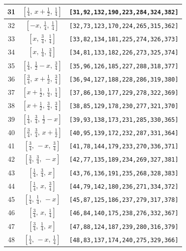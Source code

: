 \documentclass[fleqn,8pt]{jsarticle}
\begin{document}
\begin{longtable}{ccc}
31 & $\left[ \frac{1}{4},\, x + \frac{1}{2},\, \frac{1}{4} \right]$ & {\tt [31,92,132,190,223,284,324,382]} \\ \hline
32 & $\left[ - x,\, \frac{1}{4},\, \frac{1}{4} \right]$ & {\tt [32,73,123,170,224,265,315,362]} \\ \hline
33 & $\left[ x,\, \frac{3}{4},\, \frac{1}{4} \right]$ & {\tt [33,82,134,181,225,274,326,373]} \\ \hline
34 & $\left[ x,\, \frac{1}{4},\, \frac{3}{4} \right]$ & {\tt [34,81,133,182,226,273,325,374]} \\ \hline
35 & $\left[ \frac{1}{4},\, \frac{1}{2} - x,\, \frac{3}{4} \right]$ & {\tt [35,96,126,185,227,288,318,377]} \\ \hline
36 & $\left[ \frac{3}{4},\, x + \frac{1}{2},\, \frac{3}{4} \right]$ & {\tt [36,94,127,188,228,286,319,380]} \\ \hline
37 & $\left[ x + \frac{1}{2},\, \frac{1}{4},\, \frac{1}{4} \right]$ & {\tt [37,86,130,177,229,278,322,369]} \\ \hline
38 & $\left[ x + \frac{1}{2},\, \frac{3}{4},\, \frac{3}{4} \right]$ & {\tt [38,85,129,178,230,277,321,370]} \\ \hline
39 & $\left[ \frac{1}{4},\, \frac{3}{4},\, \frac{1}{2} - x \right]$ & {\tt [39,93,138,173,231,285,330,365]} \\ \hline
40 & $\left[ \frac{3}{4},\, \frac{3}{4},\, x + \frac{1}{2} \right]$ & {\tt [40,95,139,172,232,287,331,364]} \\ \hline
41 & $\left[ \frac{3}{4},\, - x,\, \frac{3}{4} \right]$ & {\tt [41,78,144,179,233,270,336,371]} \\ \hline
42 & $\left[ \frac{3}{4},\, \frac{3}{4},\, - x \right]$ & {\tt [42,77,135,189,234,269,327,381]} \\ \hline
43 & $\left[ \frac{1}{4},\, \frac{3}{4},\, x \right]$ & {\tt [43,76,136,191,235,268,328,383]} \\ \hline
44 & $\left[ \frac{1}{4},\, x,\, \frac{3}{4} \right]$ & {\tt [44,79,142,180,236,271,334,372]} \\ \hline
45 & $\left[ \frac{1}{4},\, \frac{1}{4},\, - x \right]$ & {\tt [45,87,125,186,237,279,317,378]} \\ \hline
46 & $\left[ \frac{3}{4},\, x,\, \frac{1}{4} \right]$ & {\tt [46,84,140,175,238,276,332,367]} \\ \hline
47 & $\left[ \frac{3}{4},\, \frac{1}{4},\, x \right]$ & {\tt [47,88,124,187,239,280,316,379]} \\ \hline
48 & $\left[ \frac{1}{4},\, - x,\, \frac{1}{4} \right]$ & {\tt [48,83,137,174,240,275,329,366]} \\
\end{longtable}
\end{document}
